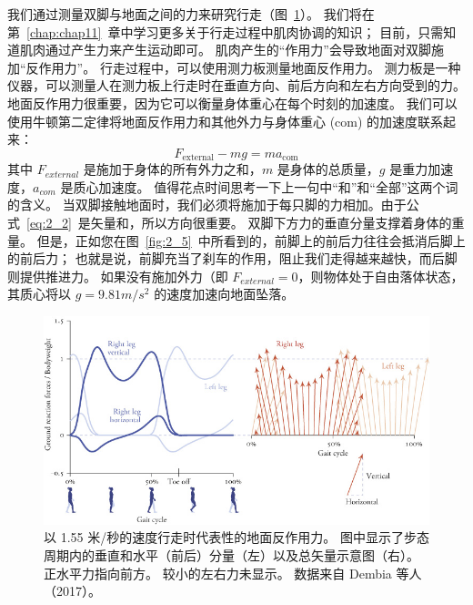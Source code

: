 我们通过测量双脚与地面之间的力来研究行走（图~\ref{fig:2_4}）。
我们将在第~\ref{chap:chap11}~章中学习更多关于行走过程中肌肉协调的知识；
目前，只需知道肌肉通过产生力来产生运动即可。
肌肉产生的“作用力”会导致地面对双脚施加“反作用力”。
行走过程中，可以使用测力板测量地面反作用力。
测力板是一种仪器，可以测量人在测力板上行走时在垂直方向、前后方向和左右方向受到的力。​​
地面反作用力很重要，因为它可以衡量身体重心在每个时刻的加速度。
我们可以使用牛顿第二定律将地面反作用力和其他外力与身体重心 (com) 的加速度联系起来：
\begin{equation}
	F_{\text{external}} - mg = m a_{\text{com}} \label{eq:2_2}
\end{equation}
其中 $F_{external}$ 是施加于身体的所有外力之和，$m$ 是身体的总质量，$g$ 是重力加速度，$a_{com}$ 是质心加速度。
值得花点时间思考一下上一句中“和”和“全部”这两个词的含义。
当双脚接触地面时，我们必须将施加于每只脚的力相加。由于公式~\ref{eq:2_2}~是矢量和，所以方向很重要。
双脚下方力的垂直分量支撑着身体的重量。
但是，正如您在图~\ref{fig:2_5}~中所看到的，前脚上的前后力往往会抵消后脚上的前后力；
也就是说，前脚充当了刹车的作用，阻止我们走得越来越快，而后脚则提供推进力。
如果没有施加外力（即 $F_{external} = 0$，则物体处于自由落体状态，其质心将以 $g = 9.81 m/s^2$ 的速度加速向地面坠落。



\begin{figure}[!htb]
	\centering
	\includegraphics[width=1.0\linewidth]{chap2/2_4}
	\caption{以 1.55 米/秒的速度行走时代表性的地面反作用力。
		图中显示了步态周期内的垂直和水平（前后）分量（左）以及总矢量示意图（右）。
		正水平力指向前方。
		较小的左右力未显示。
		数据来自 Dembia 等人（2017）。 \label{fig:2_4}}
\end{figure}


